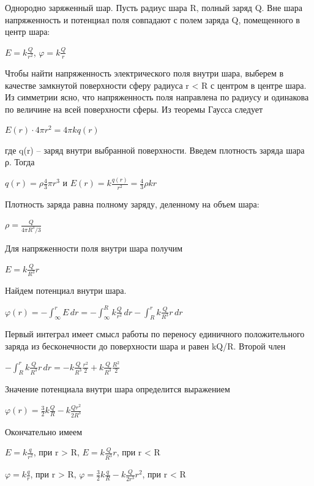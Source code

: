 \documentclass[12pt]{report}
\begin{document}
Однородно заряженный шар. Пусть радиус шара R, полный заряд Q. Вне шара напряженность и потенциал поля совпадают с полем заряда Q, помещенного в центр шара:
\begin{center}
    $ E = k \frac{Q}{r^2} $, $ \varphi = k \frac{Q}{r} $
\end{center}
Чтобы найти напряженность электрического поля внутри шара, выберем в качестве замкнутой поверхности сферу радиуса r < R с центром в центре шара. Из симметрии ясно, что напряженность поля направлена по радиусу и одинакова по величине на всей поверхности сферы. Из теоремы Гаусса следует
\begin{center}
    $E(r) \cdot 4 \pi r^2 = 4 \pi kq(r)$
\end{center}
где q(r) – заряд внутри выбранной поверхности. Введем плотность заряда шара ρ. Тогда
\begin{center}
    $q(r) = \rho \frac{4}{3} \pi r^3$ и $E(r) = k \frac{q(r)}{r^2} = \frac{4}{3} \rho k r$
\end{center}
Плотность заряда равна полному заряду, деленному на объем шара:
\begin{center}
    $\rho = \frac{Q}{4 \pi R^3/3}$
\end{center}
Для напряженности поля внутри шара получим
\begin{center}
    $E = k\frac{Q}{R^3}r$
\end{center}
Найдем потенциал внутри шара.
\begin{center}
    $\varphi(r) = -\int_{\infty}^{r}  E\,dr = -\int_{\infty}^{R} k \frac{Q}{r^2}\,dr - \int_{R}^{r} k \frac{Q}{R^3}r \,dr $
\end{center}
Первый интеграл имеет смысл работы по переносу единичного положительного заряда из бесконечности до поверхности шара и равен kQ/R. Второй член
\begin{center}
    $-\int_{R}^{r} k \frac{Q}{R^3}r \,dr = -k \frac{Q}{R^3} \frac{r^2}{2} + k \frac{Q}{R^3} \frac{R^2}{2} $
\end{center}
Значение потенциала внутри шара определится выражением
\begin{center}
    $\varphi(r) = \frac{3}{2} k \frac{Q}{R} - k \frac{Qr^2}{2R^3}$
\end{center}
Окончательно имеем
\begin{center}
    $E = k \frac{q}{r^2}$, при r > R, $E = k \frac{Q}{R^3}r$, при r < R
\end{center}
\begin{center}
    $\varphi = k \frac{q}{r}$, при r > R, $\varphi = \frac{3}{2} k \frac{q}{R} - k \frac{Q}{2r^3}r^2$, при r < R
\end{center}
\newpage
\end{document}
